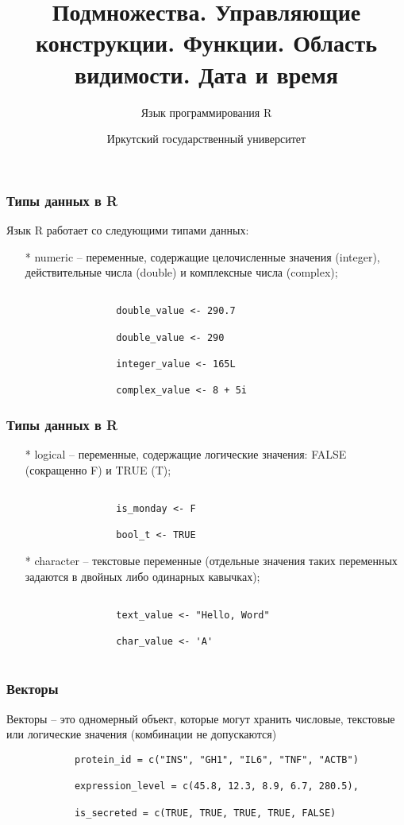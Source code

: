 \documentclass[10pt]{beamer}
\title{Подмножества. Управляющие конструкции. Функции. 
	Область видимости. Дата и время}
\subtitle{Язык программирования R}
\date{}
\author{Иркутский государственный университет}
\begin{document}
	\maketitle
	
	\begin{frame}[fragile]
		\frametitle{Типы данных в R}
		Язык R работает со следующими типами данных:
		\begin{itemize}
			\item[*] numeric – переменные, содержащие целочисленные значения (integer), действительные числа (double) и комплексные числа (complex);
			\begin{verbatim}
				
				double_value <- 290.7
				
				double_value <- 290
				
				integer_value <- 165L
				
				complex_value <- 8 + 5i
			\end{verbatim}	
		\end{itemize} 
	\end{frame} 
	
	\begin{frame}[fragile]
		\frametitle{Типы данных в R}
		\begin{itemize}
			\item[*] logical – переменные, содержащие логические значения: FALSE (сокращенно F) и TRUE (T);
			\begin{verbatim}
				
				is_monday <- F
				
				bool_t <- TRUE	
			\end{verbatim}	     
			\item[*] character – текстовые переменные (отдельные значения таких переменных задаются в двойных либо одинарных кавычках);
			
			\begin{verbatim}
				
				text_value <- "Hello, Word"
				
				char_value <- 'A'
				
			\end{verbatim}
		\end{itemize}    
	\end{frame}
	
	\begin{frame}[fragile]
		\frametitle{Векторы}
		Векторы – это одномерный объект, которые могут хранить числовые, текстовые или логические значения (комбинации не допускаются)
		\begin{verbatim}
			protein_id = c("INS", "GH1", "IL6", "TNF", "ACTB")
			
			expression_level = c(45.8, 12.3, 8.9, 6.7, 280.5),
			
			is_secreted = c(TRUE, TRUE, TRUE, TRUE, FALSE)
		\end{verbatim}
	\end{frame}
	
\end{document}
